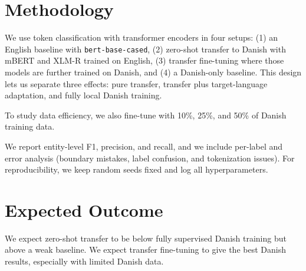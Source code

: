 \documentclass[11pt]{article}
\begin{document}
\section{Methodology}
We use token classification with transformer encoders in four setups: (1) an English baseline with \texttt{bert-base-cased}, (2) zero-shot transfer to Danish with mBERT and XLM-R trained on English, (3) transfer fine-tuning where those models are further trained on Danish, and (4) a Danish-only baseline. This design lets us separate three effects: pure transfer, transfer plus target-language adaptation, and fully local Danish training.

To study data efficiency, we also fine-tune with 10\%, 25\%, and 50\% of Danish training data.

We report entity-level F1, precision, and recall, and we include per-label and error analysis (boundary mistakes, label confusion, and tokenization issues). For reproducibility, we keep random seeds fixed and log all hyperparameters.

\section{Expected Outcome}
We expect zero-shot transfer to be below fully supervised Danish training but above a weak baseline. We expect transfer fine-tuning to give the best Danish results, especially with limited Danish data.


\end{document}
